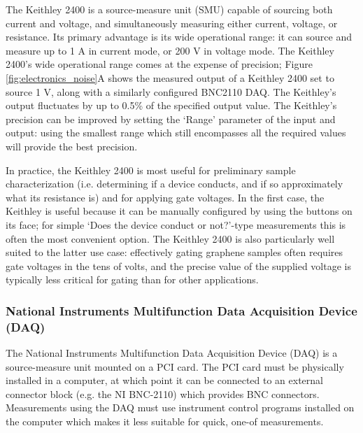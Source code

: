 \documentclass[edeposit,fullpage,draftthesis]{uiucthesis2009}
\begin{document}
            The Keithley 2400 is a source-measure unit (SMU) capable of 
            sourcing both current and voltage, and simultaneously measuring either current, voltage,
            or resistance. Its primary advantage is its wide operational range: it can source and measure
            up to 1 A in current mode, or 200 V in voltage mode.
            The Keithley 2400's wide operational range comes at the expense of precision; Figure \ref{fig:electronics_noise}A
            shows the measured output of a Keithley 2400 set to source 1 V, along with a similarly
            configured BNC2110 DAQ. The Keithley's output fluctuates by up to 0.5\% of the specified output value.
            The Keithley's precision can be improved by setting the `Range' parameter of the input and
            output: using the smallest range which still encompasses all the required values will provide the
            best precision.
            
            In practice, the Keithley 2400 is most useful for preliminary sample characterization (i.e. determining
            if a device conducts, and if so approximately what its resistance is) and for applying gate voltages.
            In the first case, the Keithley is useful because it can be manually configured by using the buttons
            on its face; for simple `Does the device conduct or not?'-type measurements this is often the most 
            convenient option.
            The Keithley 2400 is also particularly well suited to the latter use case: effectively gating graphene
            samples often requires gate voltages in the tens of volts, and the precise value of the supplied voltage
            is typically less critical for gating than for other applications.
            
            
            \subsubsection*{National Instruments Multifunction Data Acquisition Device (DAQ)} 
            
            The National Instruments Multifunction Data Acquisition Device (DAQ) is a source-measure unit 
            mounted on a PCI card. The PCI card must be physically installed in a computer, at which point
            it can be connected to an external connector block (e.g. the NI BNC-2110) which provides
            BNC connectors. Measurements using the DAQ must use instrument control programs installed
            on the computer which makes it less suitable for quick, one-of measurements.
            
\end{document}
